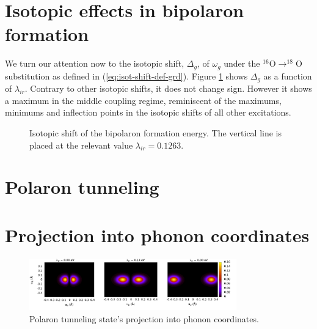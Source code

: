 \section{Isotopic effects in bipolaron formation}
\label{sec:grd-isotopic}

We turn our attention now to the isotopic shift, $\Delta_g$, of $\omega_g$ under the $^{16}$O$\rightarrow ^{18}$O substitution as defined in (\ref{eq:isot-shift-def-grd}).
Figure \ref{fig:isotPolaronFormation} shows $\Delta_g$ as a function of $\lambda_{ir}$.
Contrary to other isotopic shifts, it does not change sign.
However it shows a maximum in the middle coupling regime, reminiscent of the maximums, minimums and inflection points in the isotopic shifts of all other excitations.

\begin{figure}[ht!]
  \centering
  
  \caption{Isotopic shift of the bipolaron formation energy. The vertical line is placed at the relevant value $\lambda_{ir}=0.1263$.}
  \label{fig:isotPolaronFormation}
\end{figure}


\section{Polaron tunneling}



\section{Projection into phonon coordinates}

\begin{figure}[ht!]
\centering
\includegraphics[width=0.8\textwidth]{images/ph-first_infrared.png}
\caption{Polaron tunneling state's projection into phonon coordinates.}
\label{fig:ph-first_infrared}
\end{figure}

